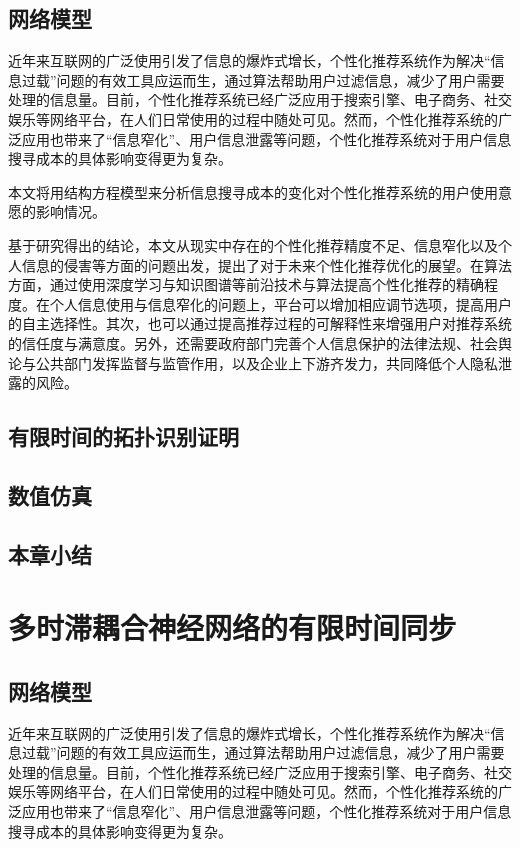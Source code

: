 \documentclass[a4paper,zihao=-4,UTF8]{ctexart}
\numberwithin{equation}{section}
\begin{document}
	\subsection{网络模型}
	近年来互联网的广泛使用引发了信息的爆炸式增长，个性化推荐系统作为解决“信息过载”问题的有效工具应运而生，通过算法帮助用户过滤信息，减少了用户需要处理的信息量。目前，个性化推荐系统已经广泛应用于搜索引擎、电子商务、社交娱乐等网络平台，在人们日常使用的过程中随处可见。然而，个性化推荐系统的广泛应用也带来了“信息窄化”、用户信息泄露等问题，个性化推荐系统对于用户信息搜寻成本的具体影响变得更为复杂。
	
	本文将用结构方程模型来分析信息搜寻成本的变化对个性化推荐系统的用户使用意愿的影响情况。
	
	基于研究得出的结论，本文从现实中存在的个性化推荐精度不足、信息窄化以及个人信息的侵害等方面的问题出发，提出了对于未来个性化推荐优化的展望。在算法方面，通过使用深度学习与知识图谱等前沿技术与算法提高个性化推荐的精确程度。在个人信息使用与信息窄化的问题上，平台可以增加相应调节选项，提高用户的自主选择性。其次，也可以通过提高推荐过程的可解释性来增强用户对推荐系统的信任度与满意度。另外，还需要政府部门完善个人信息保护的法律法规、社会舆论与公共部门发挥监督与监管作用，以及企业上下游齐发力，共同降低个人隐私泄露的风险。
	\subsection{有限时间的拓扑识别证明}
	\subsection{数值仿真}
	\subsection{本章小结}

\newpage
\section{多时滞耦合神经网络的有限时间同步}
	\subsection{网络模型}
	近年来互联网的广泛使用引发了信息的爆炸式增长，个性化推荐系统作为解决“信息过载”问题的有效工具应运而生，通过算法帮助用户过滤信息，减少了用户需要处理的信息量。目前，个性化推荐系统已经广泛应用于搜索引擎、电子商务、社交娱乐等网络平台，在人们日常使用的过程中随处可见。然而，个性化推荐系统的广泛应用也带来了“信息窄化”、用户信息泄露等问题，个性化推荐系统对于用户信息搜寻成本的具体影响变得更为复杂。
	
\end{document}
